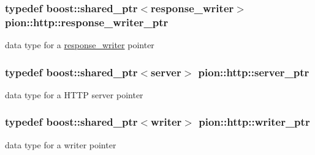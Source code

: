 \hypertarget{namespacepion_1_1http_aaf75f88dc37f535e5584e55450257e14}{
\subsubsection[{response\-\_\-writer\-\_\-ptr}]{\setlength{\rightskip}{0pt plus 5cm}typedef boost\-::shared\-\_\-ptr$<${\bf response\-\_\-writer}$>$ {\bf pion\-::http\-::response\-\_\-writer\-\_\-ptr}}}\label{namespacepion_1_1http_aaf75f88dc37f535e5584e55450257e14}


data type for a \hyperlink{classpion_1_1http_1_1response__writer}{response\-\_\-writer} pointer 

\hypertarget{namespacepion_1_1http_a3c92c485d7cc919d4fcaa2128b096382}{
\subsubsection[{server\-\_\-ptr}]{\setlength{\rightskip}{0pt plus 5cm}typedef boost\-::shared\-\_\-ptr$<${\bf server}$>$ {\bf pion\-::http\-::server\-\_\-ptr}}}\label{namespacepion_1_1http_a3c92c485d7cc919d4fcaa2128b096382}


data type for a H\-T\-T\-P server pointer 

\hypertarget{namespacepion_1_1http_ab8e875e702aba19923014f31d69762df}{
\subsubsection[{writer\-\_\-ptr}]{\setlength{\rightskip}{0pt plus 5cm}typedef boost\-::shared\-\_\-ptr$<${\bf writer}$>$ {\bf pion\-::http\-::writer\-\_\-ptr}}}\label{namespacepion_1_1http_ab8e875e702aba19923014f31d69762df}


data type for a writer pointer 




